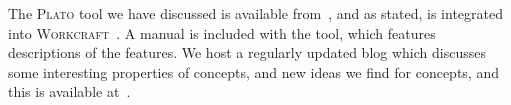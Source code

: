 \documentclass[british,conference,compsoc]{IEEEtran}
\newcommand{\noun}[1]{\textsc{#1}}
\begin{document}
The \noun{Plato} tool we have discussed is available 
from~\cite{2016_concepts_github}, and as stated, is integrated into 
\noun{Workcraft}~\cite{Workcraft_website}. A manual is included with the tool, 
which features descriptions of the features. We host a regularly updated blog 
which discusses some interesting properties of concepts, and new ideas we find 
for concepts, and this is available  at~\cite{2016_blog_concepts}.




\end{document}
